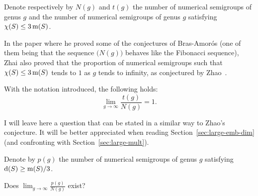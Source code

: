 Denote respectively by $N(g)$ and $t(g)$ the number of numerical semigroups of genus $g$ and the number of numerical semigroups of genus $g$ satisfying $\operatorname{\chi}(S) \le 3\operatorname{m}(S)$.

In the paper where he proved some of the conjectures of Bras-Amorós (one of them being that the sequence $\big(N(g)\big)$ behaves like the Fibonacci sequence), Zhai also proved that the proportion of numerical semigroups such that $\operatorname{\chi}(S) \le 3\operatorname{m}(S)$ tends to $1$ as $g$ tends to infinity, as conjectured by Zhao~\cite{Zhao2010SF-Constructing}.

\begin{proposition}\label{prop:Zhao-Zhai}
	With the notation introduced, the following holds:
	$$\lim_{g\to\infty} \frac{t(g)}{N(g)}=1.$$
\end{proposition}

I will leave here a question that can be stated in a similar way to Zhao's conjecture. It will be better appreciated when reading Section~\ref{sec:large-emb-dim} (and confronting with Section~\ref{sec:large-mult}).

Denote by $p(g)$ the number of numerical semigroups of genus $g$ satisfying $\operatorname{d}(S) \ge \operatorname{m}(S)/3$.
\begin{question}\label{quest:emb-dim-asymptotics}
	Does $\lim_{g\to\infty} \frac{p(g)}{N(g)}$ exist?
\end{question}


